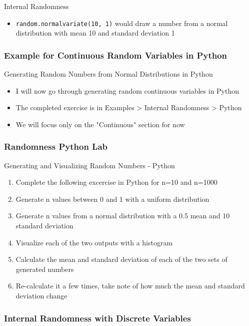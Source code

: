 \documentclass[handout, 11pt]{beamer}
\begin{document}
\begin{section}{Internal Randomness}
\begin{frame}
\begin{itemize}
\textcolor{blue}{\underline{\href{https://docs.python.org/3.7/library/random.html\#real-valued-distributions}{(and other distributions)}}}
is easier: just one function
\texttt{random.normalvariate}
\vfill
\item \texttt{random.normalvariate(10, 1)}
would draw a number from a normal distribution with mean 10 and standard deviation 1
\end{itemize}
\end{frame}
\begin{frame}
\frametitle{Example for Continuous Random Variables in Python}
{
\begin{block}{Generating Random Numbers from Normal Distributions in Python}
\begin{itemize}
\item I will now go through generating random continuous variables in Python
\item The completed exercise is in Examples > Internal Randomness > Python 
\item We will focus only on the "Continuous" section for now
\end{itemize}
\end{block}
}
\end{frame}
\begin{frame}
\frametitle{Randomness Python Lab}
{
\begin{block}{Generating and Visualizing Random Numbers - Python}
\begin{enumerate}
\item Complete the following excercise in Python for n=10 and n=1000
\item Generate n values between 0 and 1 with a uniform distribution
\item Generate n values from a normal distribution with a 0.5 mean and 10 standard deviation
\item Visualize each of the two outputs with a histogram
\item Calculate the mean and standard deviation of each of the two sets of generated numbers
\item Re-calculate it a few times, take note of how much the mean and standard deviation change
\end{enumerate}
\vfill
\end{block}
}
\label{labs:randomness-python-lab-1}
\end{frame}
\begin{frame}
\frametitle{Internal Randomness with Discrete Variables}

\end{frame}
\end{section}
\end{document}
